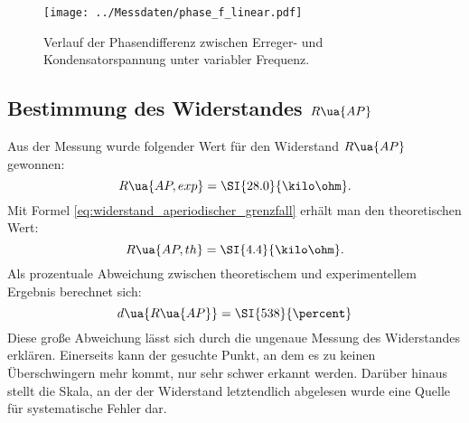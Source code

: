 \begin{figure}
  \centering
  \texttt{[image: ../Messdaten/phase\_f\_linear.pdf]}
  \caption{Verlauf der Phasendifferenz zwischen Erreger- und Kondensatorspannung unter variabler Frequenz.}
  \label{fig: phasenverlauf}
\end{figure}

\newpage
\subsection{Bestimmung des Widerstandes $R\ua{AP}$}
Aus der Messung wurde folgender Wert für den Widerstand $R\ua{AP}$ gewonnen:
\begin{equation}
  R\ua{AP, exp} = \SI{28.0}{\kilo\ohm}.
\end{equation}
Mit Formel \eqref{eq:widerstand_aperiodischer_grenzfall} erhält man den theoretischen Wert:
\begin{equation}
    R\ua{AP, th} = \SI{4.4}{\kilo\ohm}.
\end{equation}
Als prozentuale Abweichung zwischen theoretischem und experimentellem Ergebnis berechnet sich:
\begin{equation}
  d\ua{R\ua{AP}} = \SI{538}{\percent}
\end{equation}
Diese große Abweichung lässt sich durch die ungenaue Messung des Widerstandes erklären. Einerseits kann der gesuchte Punkt,
an dem es zu keinen Überschwingern mehr kommt, nur sehr schwer erkannt werden. Darüber hinaus stellt die Skala, an der der Widerstand
letztendlich abgelesen wurde eine Quelle für systematische Fehler dar.

